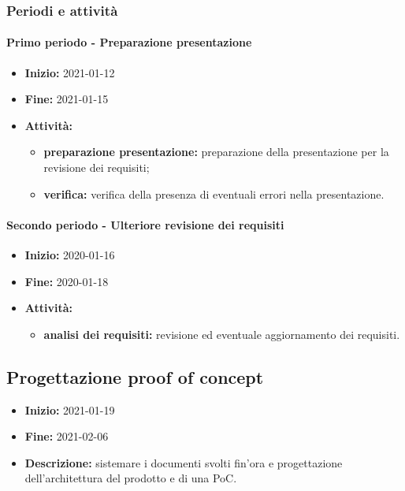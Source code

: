 \subsubsection{Periodi e attività}

\paragraph[Primo periodo]{Primo periodo - \textnormal{Preparazione presentazione}}
\begin{itemize}
    \item [] \textbf{Inizio:} 2021-01-12
    \item [] \textbf{Fine:} 2021-01-15
    \item [] \textbf{Attività:}
          \begin{itemize}
              \item \textbf{preparazione presentazione:} preparazione della presentazione per la revisione dei requisiti;
              \item \textbf{verifica:} verifica della presenza di eventuali errori nella presentazione.
          \end{itemize}
\end{itemize}

\paragraph[Secondo periodo]{Secondo periodo - \textnormal{Ulteriore revisione dei requisiti}}
\begin{itemize}
    \item [] \textbf{Inizio:} 2020-01-16
    \item [] \textbf{Fine:} 2020-01-18
    \item [] \textbf{Attività:}
          \begin{itemize}
              \item \textbf{analisi dei requisiti:} revisione ed eventuale aggiornamento dei requisiti.
          \end{itemize}
\end{itemize}


\subsection{Progettazione proof of concept} \label{_pianificazioneProgettazionePoC}
\begin{itemize}
    \item []\textbf{Inizio:} 2021-01-19
    \item []\textbf{Fine:} 2021-02-06
    \item []\textbf{Descrizione:} sistemare i documenti svolti fin'ora e progettazione dell'architettura del prodotto e di una PoC.
\end{itemize}

